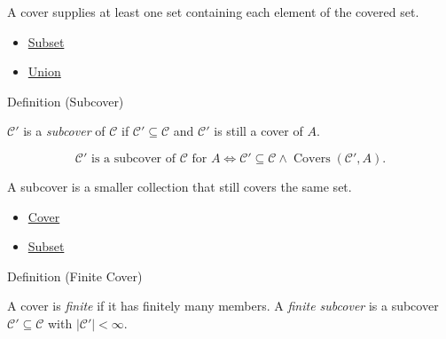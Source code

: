 \begin{remark*}[Interpretation]
A cover supplies at least one set containing each element of the covered set.
\end{remark*}


\begin{dependencies}
\begin{itemize}
  \item \hyperref[def:subset]{Subset}
  \item \hyperref[def:union]{Union}
\end{itemize}
\end{dependencies}

\begin{definitionbox}{Definition (Subcover)}
\begin{definition}[Subcover]\label{def:subcover}
$\mathcal{C}'$ is a \emph{subcover} of $\mathcal{C}$ if $\mathcal{C}'
\subseteq \mathcal{C}$ and $\mathcal{C}'$ is still a cover of $A$.
\end{definition}
\end{definitionbox}

\begin{remark*}
\[
  \mathcal{C}'\text{ is a subcover of }\mathcal{C}\text{ for }A
  \iff
  \mathcal{C}'\subseteq\mathcal{C}
  \wedge
  \operatorname{Covers}(\mathcal{C}',A).
\]
\end{remark*}

\begin{remark*}[Interpretation]
A subcover is a smaller collection that still covers the same set.
\end{remark*}


\begin{dependencies}
\begin{itemize}
  \item \hyperref[def:cover-full]{Cover}
  \item \hyperref[def:subset]{Subset}
\end{itemize}
\end{dependencies}

\begin{definitionbox}{Definition (Finite Cover)}
\begin{definition}\label{def:finite-cover}
A cover is \emph{finite} if it has finitely many members. A \emph{finite
subcover} is a subcover $\mathcal{C}' \subseteq \mathcal{C}$ with
$|\mathcal{C}'| < \infty$.
\end{definition}
\end{definitionbox}

